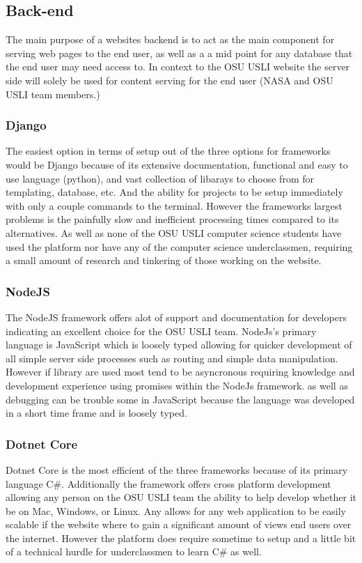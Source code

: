 \documentclass[onecolumn, draftclsnofoot,10pt, compsoc]{IEEEtran}
\begin{document}
    \subsection{Back-end}
    The main purpose of a websites backend is to act as the main component for serving web pages to the end user, as well as a a mid point for any database that the end user may need access to. In context to the OSU USLI website the server side will solely be used for content serving for the end user (NASA and OSU USLI team members.)
    \subsubsection{Django}
    The easiest option in terms of setup out of the three options for frameworks would be Django because of its extensive documentation, functional and easy to use language (python), and vast collection of libarays to choose from for templating, database, etc. And the ability for projects to be setup immediately with only a couple commands to the terminal. However the frameworks largest problems is the painfully slow and inefficient processing times compared to its alternatives. As well as none of the OSU USLI computer science students have used the platform nor have any of the computer science underclassmen, requiring a small amount of research and tinkering of those working on the website. 
    \subsubsection{NodeJS}
    The NodeJS framework offers alot of support and documentation for developers indicating an excellent choice for the OSU USLI team. NodeJs's primary language is JavaScript which is loosely typed allowing for quicker development of all simple server side processes such as routing and simple data manipulation. However if library are used most tend to be asyncronous requiring knowledge and development experience using promises within the NodeJs framework. as well as debugging can be trouble some in JavaScript because the language was developed in a short time frame and is loosely typed.
    \subsubsection{Dotnet Core}
    Dotnet Core is the most efficient of the three frameworks because of its primary language C\#. Additionally the framework offers cross platform development allowing any person on the OSU USLI team the ability to help develop whether it be on Mac, Windows, or Linux. Any allows for any web application to be easily scalable if the website where to gain a significant amount of views end users over the internet. However the platform does require sometime to setup and a little bit of a technical hurdle for underclassmen to learn C\# as well. 
\end{document}
